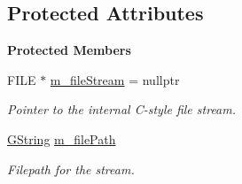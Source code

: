 \subsection*{Protected Attributes}
\begin{Indent}\textbf{ Protected Members}\par
\begin{DoxyCompactItemize}
\item 
\mbox{\label{classrev_1_1_file_stream_ab5f6a6e097046cb5344e46b51e962d29}} 
F\+I\+LE $\ast$ \mbox{\hyperlink{classrev_1_1_file_stream_ab5f6a6e097046cb5344e46b51e962d29}{m\+\_\+file\+Stream}} = nullptr
\begin{DoxyCompactList}\small\item\em Pointer to the internal C-\/style file stream. \end{DoxyCompactList}\item 
\mbox{\label{classrev_1_1_file_stream_abd6b4a7f67f804ecd878d41530ce650b}} 
\mbox{\hyperlink{classrev_1_1_g_string}{G\+String}} \mbox{\hyperlink{classrev_1_1_file_stream_abd6b4a7f67f804ecd878d41530ce650b}{m\+\_\+file\+Path}}
\begin{DoxyCompactList}\small\item\em Filepath for the stream. \end{DoxyCompactList}\end{DoxyCompactItemize}
\end{Indent}
